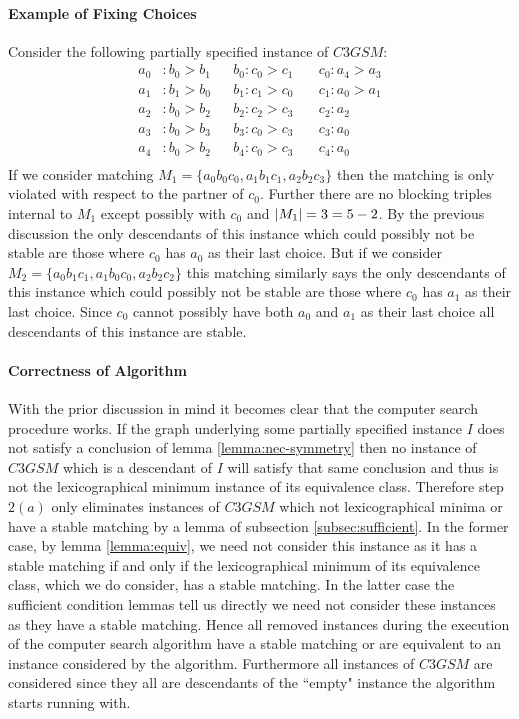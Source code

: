 \paragraph{Example of Fixing Choices}
Consider the following partially specified instance of $C3GSM$:
\begin{align*}
a_0 &: b_0 > b_1  &&b_0: c_0 > c_1 &\ &c_0:a_4 > a_3\\
a_1 &: b_1 > b_0  &&b_1: c_1 > c_0 &\ &c_1: a_0 > a_1 \\
a_2 &: b_0  > b_2  &&b_2: c_2  > c_3 &\ &c_2: a_2 \\
a_3 &: b_0  > b_3  &&b_3: c_0  > c_3 &\ &c_3: a_0\\
a_4 &: b_0  > b_2  &&b_4: c_0  > c_3 &\ &c_4: a_0\\
\end{align*}
If we consider matching $M_1 = \{a_0b_0c_0, a_1b_1c_1, a_2b_2c_3\}$ then the matching is only violated with respect to the partner of $c_0$. Further there are no blocking triples internal to $M_1$ except possibly with $c_0$ and $\left|M_1\right| = 3 = 5-2$. By the previous discussion the only descendants of this instance which could possibly not be stable are those where $c_0$ has $a_0$ as their last choice. But if we consider $M_2= \{a_0b_1c_1, a_1b_0c_0, a_2b_2c_2\}$ this matching similarly says the only descendants of this instance which could possibly not be stable are those where $c_0$ has $a_1$ as their last choice. Since $c_0$ cannot possibly have both $a_0$ and $a_1$ as their last choice all descendants of this instance are stable.
\paragraph{Correctness of Algorithm}
With the prior discussion in mind it becomes clear that the computer search procedure works. If the graph underlying some partially specified instance $I$ does not satisfy a conclusion of lemma \ref{lemma:nec-symmetry} then no instance of $C3GSM$ which is a descendant of $I$ will satisfy that same conclusion and thus is not the lexicographical minimum instance of its equivalence class. Therefore step $2(a)$ only eliminates instances of $C3GSM$ which not lexicographical minima or have a stable matching by a lemma of subsection \ref{subsec:sufficient}. In the former case, by lemma \ref{lemma:equiv}, we need not consider this instance as it has a stable matching if and only if the lexicographical minimum of its equivalence class, which we do consider, has a stable matching. In the latter case the sufficient condition lemmas tell us directly we need not consider these instances as they have a stable matching. Hence all removed instances during the execution of the computer search algorithm have a stable matching or are equivalent to an instance considered by the algorithm. Furthermore all instances of $C3GSM$ are considered since they all are descendants of the ``empty" instance the algorithm starts running with.
